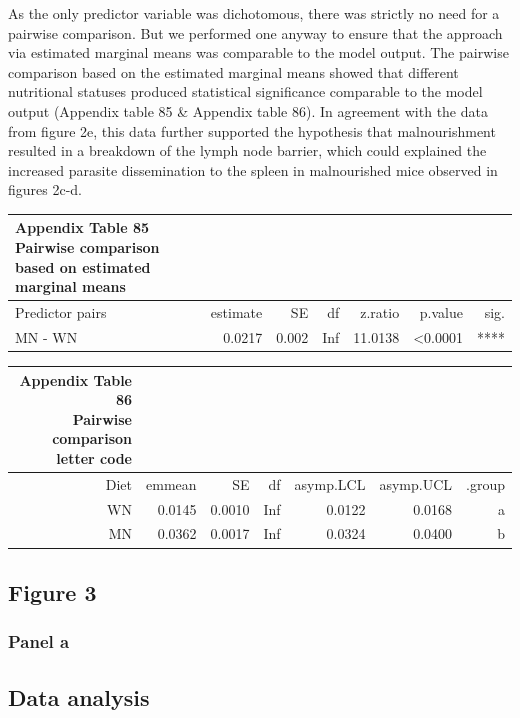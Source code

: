 \documentclass[
  12pt,
  letterpaper,
]{article}
\begin{document}
As the only predictor variable was dichotomous, there was strictly no need for a pairwise comparison. But we performed one anyway to ensure that the approach via estimated marginal means was comparable to the model output. The pairwise comparison based on the estimated marginal means showed that different nutritional statuses produced statistical significance comparable to the model output (Appendix table 85 \& Appendix table 86). In agreement with the data from figure 2e, this data further supported the hypothesis that malnourishment resulted in a breakdown of the lymph node barrier, which could explained the increased parasite dissemination to the spleen in malnourished mice observed in figures 2c-d.

\begin{longtable}{l|rrrrrr}
\caption*{
{\large \textbf{Appendix Table 85}} \\ 
{\small \textbf{Pairwise comparison based on estimated marginal means}}
} \\ 
\toprule
\multicolumn{1}{l}{Predictor pairs} & estimate & SE & df & z.ratio & p.value & sig. \\ 
\midrule\addlinespace[2.5pt]
MN - WN & 0.0217 & 0.002 & Inf & 11.0138 & <0.0001 & **** \\ 
\bottomrule
\end{longtable}

\begin{longtable}{rrrrrrr}
\caption*{
{\large \textbf{Appendix Table 86}} \\ 
{\small \textbf{Pairwise comparison letter code}}
} \\ 
\toprule
Diet & emmean & SE & df & asymp.LCL & asymp.UCL & .group \\ 
\midrule\addlinespace[2.5pt]
WN & 0.0145 & 0.0010 & Inf & 0.0122 & 0.0168 &  a  \\ 
MN & 0.0362 & 0.0017 & Inf & 0.0324 & 0.0400 &   b \\ 
\bottomrule
\end{longtable}

\subsection{Figure 3}\label{figure-3}

\subsubsection{Panel a}\label{panel-a-1}

\subsection{Data analysis}\label{data-analysis-4}
\end{document}
